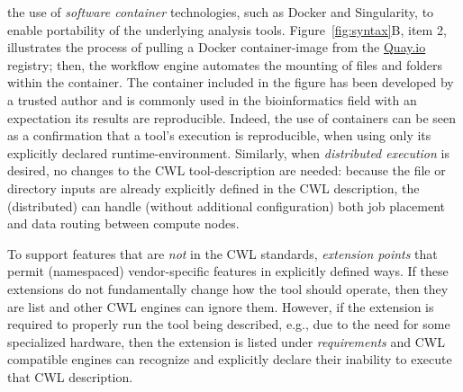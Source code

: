 \documentclass[sigconf,authordraft]{acmart}
\begin{document}
 the use of \textit{software container} technologies, such as Docker and Singularity, to enable portability of the underlying analysis tools. Figure~\ref{fig:syntax}B, item 2, illustrates the process of pulling a Docker container-image from the \url{Quay.io} registry; then, the workflow engine automates the mounting of files and folders within the container. The container included in the figure has been developed by a trusted author and is commonly used in the bioinformatics field with an expectation its results are reproducible. Indeed, the use of containers can be seen as a confirmation that a tool’s execution is reproducible, when using only its explicitly declared runtime-environment. Similarly, when \textit{distributed execution} is desired, no changes to the CWL tool-description are needed: because the file or directory inputs are already explicitly defined in the CWL description, the (distributed)  can handle (without additional configuration) both job placement and data routing between compute nodes.


 To support features that are \textit{not} in the CWL standards,  \textit{extension points} that permit (namespaced) vendor-specific features in explicitly defined ways. If these extensions do not fundamentally change how the tool should operate, then they are  list and other CWL  engines can ignore them. However, if the extension is required to properly run the tool being described, e.g., due to the need for some specialized hardware, then the extension is listed under \textit{requirements} and CWL compatible engines can recognize and explicitly declare their inability to execute that CWL description.
\end{document}
